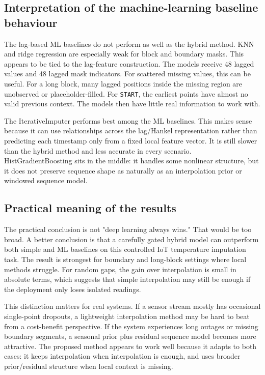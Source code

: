 \subsection{Interpretation of the machine-learning baseline behaviour}

The lag-based ML baselines do not perform as well as the hybrid method. KNN and ridge regression are especially weak for block and boundary masks. This appears to be tied to the lag-feature construction. The models receive 48 lagged values and 48 lagged mask indicators. For scattered missing values, this can be useful. For a long block, many lagged positions inside the missing region are unobserved or placeholder-filled. For \texttt{START}, the earliest points have almost no valid previous context. The models then have little real information to work with.

The IterativeImputer performs best among the ML baselines. This makes sense because it can use relationships across the lag/Hankel representation rather than predicting each timestamp only from a fixed local feature vector. It is still slower than the hybrid method and less accurate in every scenario. HistGradientBoosting sits in the middle: it handles some nonlinear structure, but it does not preserve sequence shape as naturally as an interpolation prior or windowed sequence model.

\subsection{Practical meaning of the results}

The practical conclusion is not "deep learning always wins." That would be too broad. A better conclusion is that a carefully gated hybrid model can outperform both simple and ML baselines on this controlled IoT temperature imputation task. The result is strongest for boundary and long-block settings where local methods struggle. For random gaps, the gain over interpolation is small in absolute terms, which suggests that simple interpolation may still be enough if the deployment only loses isolated readings.

This distinction matters for real systems. If a sensor stream mostly has occasional single-point dropouts, a lightweight interpolation method may be hard to beat from a cost-benefit perspective. If the system experiences long outages or missing boundary segments, a seasonal prior plus residual sequence model becomes more attractive. The proposed method appears to work well because it adapts to both cases: it keeps interpolation when interpolation is enough, and uses broader prior/residual structure when local context is missing.

